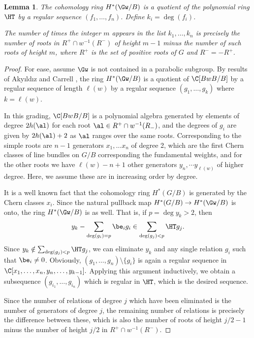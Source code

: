 \documentclass[12pt]{wart}
\newtheorem{lem}[thm]{Lemma}
\theoremstyle{remark}
\begin{document}
\begin{lem}\label{schub-lemma}
  The cohomology ring $H^*(\Gw/B)$ is a quotient of the polynomial
  ring $\HT$ by a regular sequence $(f_1,\ldots, f_{n})$.  Define
  $k_i=\deg(f_i)$.

  The number of times the integer $m$ appears in the list $k_1,\ldots,
  k_{n}$ is precisely the number of roots in $R^+\cap w^{-1}(R^-)$
  of height $m-1$ minus the number of such roots of height $m$, where
  $R^+$ is the set of positive roots of $G$ and $R^-=-R^+$.
\end{lem}
\begin{proof}
  For ease, assume $\Gw$ is not contained in a parabolic subgroup.  By
  results of Aky\i ld\i z and Carrell \cite{AC89}, the ring $H^*(\Gw/B)$
  is a quotient of $\C[BwB/B]$ by a regular sequence of length
  $\ell(w)$ by a regular sequence $(g_1,\ldots, g_{k})$ where $k=\ell(w)$.

  In this grading, $\C[BwB/B]$ is a polynomial algebra generated by
  elements of degree $2h(\al)$ for each root $\al\in R^+\cap
  w^{-1}(R_-)$, and the degrees of $g_i$ are given by $2h(\al)+2$ as
  $\al$ ranges over the same roots.  Corresponding to the simple roots
  are $n-1$ generators $x_1,\ldots x_{n}$ of degree 2, which are the
  first Chern classes of line bundles on $G/B$ corresponding the
  fundamental weights, and for the other roots we have $\ell(w)-n+1$
  other generators $y_n,\cdots y_{\ell(w)}$ of higher degree.  Here,
  we assume these are in increasing order by degree.  

  It is a well known fact that the cohomology ring $H^*(G/B)$ is
  generated by the Chern classes $x_i$.  Since the natural pullback
  map $H^*(G/B)\to H^*(\Gw/B)$ is onto, the ring $H^*(\Gw/B)$ is as
  well.  That is, if $p=\deg y_{k}>2$, then
  \begin{equation*}
    y_k-\sum_{\deg(g_i)=p}\be_ig_i\in \sum_{\deg(g_j)<p} \HT g_j.
  \end{equation*}
  Since $y_k\notin \sum_{\deg(g_j)<p}\HT g_j$, we can eliminate $y_k$
  and any single relation $g_i$ such that $\be_i\neq 0$.  Obviously, 
  $(g_1,\ldots,g_n)\setminus\{g_i\}$ is again a regular sequence in
  $\C[x_1,\ldots,x_{n},y_n,\ldots, y_{k-1}].$ Applying this argument
  inductively, we obtain a subsequence $(g_{i_1},\ldots, g_{i_{n}})$
  which is regular in $\HT$, which is the desired sequence.

  Since the number of relations of degree $j$ which have been
  eliminated is the number of generators of degree $j$, the remaining
  number of relations is precisely the difference between these, which
  is also the number of roots of height $j/2-1$ minus the number of
  height $j/2$ in $R^+\cap w^{-1}(R^-)$.
\end{proof}
\end{document}
